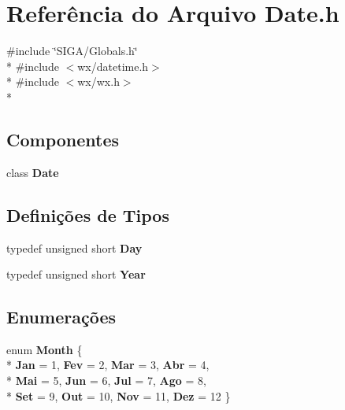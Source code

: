 \section{Referência do Arquivo Date.\+h}
\label{_s_i_g_a_2_date_8h}
{\ttfamily \#include \char`\"{}S\+I\+G\+A/\+Globals.\+h\char`\"{}}\\*
{\ttfamily \#include $<$wx/datetime.\+h$>$}\\*
{\ttfamily \#include $<$wx/wx.\+h$>$}\\*
\subsection*{Componentes}
\begin{DoxyCompactItemize}
\item 
class {\bf Date}
\end{DoxyCompactItemize}
\subsection*{Definições de Tipos}
\begin{DoxyCompactItemize}
\item 
typedef unsigned short {\bf Day}
\item 
typedef unsigned short {\bf Year}
\end{DoxyCompactItemize}
\subsection*{Enumerações}
\begin{DoxyCompactItemize}
\item 
enum {\bf Month} \{ \\*
{\bf Jan} = 1, 
{\bf Fev} = 2, 
{\bf Mar} = 3, 
{\bf Abr} = 4, 
\\*
{\bf Mai} = 5, 
{\bf Jun} = 6, 
{\bf Jul} = 7, 
{\bf Ago} = 8, 
\\*
{\bf Set} = 9, 
{\bf Out} = 10, 
{\bf Nov} = 11, 
{\bf Dez} = 12
 \}
\end{DoxyCompactItemize}
